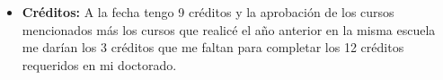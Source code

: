 \begin{itemize}
\item  \textbf{Cr\'editos:} 
A la fecha tengo 9 cr\'editos y la aprobaci\'on de los cursos mencionados m\'as los cursos que realic\'e el a\~no anterior en la misma escuela me dar\'ian los 3 cr\'editos que me faltan para completar los 12 cr\'editos requeridos en mi doctorado.


\end{itemize}




